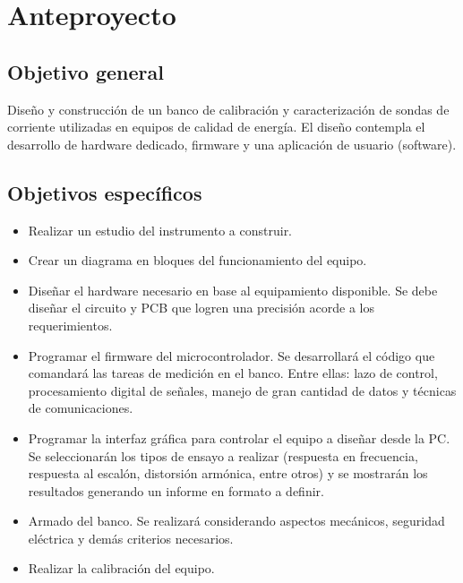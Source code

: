 \documentclass[titlepage, 12pt]{article}
\begin{document}
\section{Anteproyecto}

  \subsection{Objetivo general}
  Diseño y construcción de un banco de calibración y caracterización de sondas de corriente utilizadas en equipos de calidad de energía. El diseño contempla el desarrollo de hardware dedicado, firmware y una aplicación de usuario (software).

  \subsection{Objetivos específicos}

      \begin{itemize}
          \item Realizar un estudio del instrumento a construir.
          \item Crear un diagrama en bloques del funcionamiento del equipo.
          \item Diseñar el hardware necesario en base al equipamiento disponible. Se debe diseñar el circuito y PCB que logren una precisión acorde a los requerimientos.
          \item Programar el firmware del microcontrolador. Se desarrollará el código que comandará las tareas de medición en el banco. Entre ellas: lazo de control, procesamiento digital de señales, manejo de gran cantidad de datos y técnicas de comunicaciones.
          \item Programar la interfaz gráfica para controlar el equipo a diseñar desde la PC. Se seleccionarán los tipos de ensayo a realizar (respuesta en frecuencia, respuesta al escalón, distorsión armónica, entre otros) y se mostrarán los resultados generando un informe en formato a definir.
          \item Armado del banco. Se realizará considerando aspectos mecánicos, seguridad eléctrica y demás criterios necesarios.
          \item Realizar la calibración del equipo.
      \end{itemize}
\end{document}
